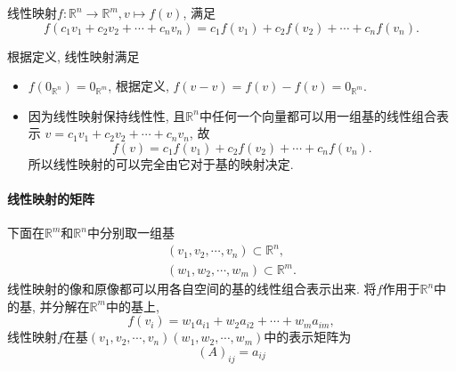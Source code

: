 
\begin{definition}
    线性映射$f\colon \mathbb{R}^{n} \to \mathbb{R}^{m}, v \mapsto f(v)$, 满足
    \begin{equation}
      f\left( c_1 v_1 + c_2 v_2 + \cdots + c_n v_n \right) = c_1 f\left( v_1 \right) + c_2 f\left( v_2 \right) + \cdots  + c_n f\left( v_n \right) .
    \end{equation}
\end{definition}

根据定义, 线性映射满足
\begin{itemize}
    \item $f\left( 0_{\mathbb{R}^{n}} \right) = 0_{\mathbb{R}^{m}}$, 根据定义, $f\left( v-v \right) = f\left( v \right) - f\left( v \right) = 0_{\mathbb{R}^{m}}$.
    
    \item 因为线性映射保持线性性, 且$\mathbb{R}^{n}$中任何一个向量都可以用一组基的线性组合表示 $v = c_1 v_1 + c_2 v_2 + \cdots +c_n v_n$, 故
    \begin{equation}
      f\left( v \right) = c_1 f\left( v_1 \right) + c_2 f\left( v_2 \right) + \cdots +c_n f\left( v_n \right) .
    \end{equation}
    所以线性映射的可以完全由它对于基的映射决定.

\end{itemize}

\paragraph{线性映射的矩阵}
下面在$\mathbb{R}^{m}$和$\mathbb{R}^{n}$中分别取一组基
\begin{equation}
  \begin{gathered}
    \left( v_1,v_2,\cdots,v_n \right) \subset \mathbb{R}^{n},
    \\
    \left( w_1,w_2,\cdots,w_m \right) \subset \mathbb{R}^{m}.
  \end{gathered}
\end{equation}
线性映射的像和原像都可以用各自空间的基的线性组合表示出来. 将$f$作用于$\mathbb{R}^{n}$中的基, 并分解在$\mathbb{R}^{m}$中的基上,
\begin{equation}
  f\left( v_i \right) = w_1 a_{i 1} + w_{2} a_{i 2} + \cdots + w_m a_{i m},
\end{equation}
线性映射$f$在基$\left( v_1,v_2,\cdots,v_n \right) \left( w_1,w_2,\cdots,w_m \right) $中的表示矩阵为
\begin{equation}
  \left( A \right) _{ij} = a_{ij}
\end{equation}

